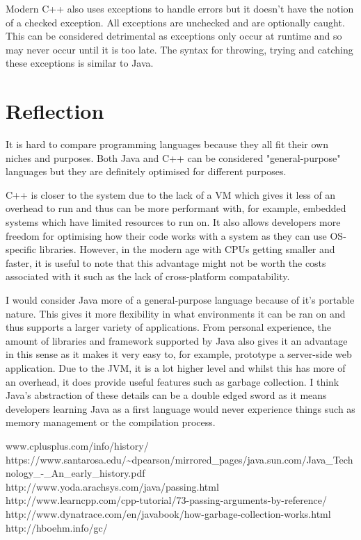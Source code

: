 \documentclass[]{report}
\begin{document}
Modern C++ also uses exceptions to handle errors but it doesn't have the notion of a checked exception. All exceptions are unchecked and are optionally caught. This can be considered detrimental as exceptions only occur at runtime and so may never occur until it is too late. The syntax for throwing, trying and catching these exceptions is similar to Java.

\section{Reflection}

It is hard to compare programming languages because they all fit their own niches and purposes. Both Java and C++ can be considered "general-purpose" languages but they are definitely optimised for different purposes. 

C++ is closer to the system due to the lack of a VM which gives it less of an overhead to run and thus can be more performant with, for example, embedded systems which have limited resources to run on. It also allows developers more freedom for optimising how their code works with a system as they can use OS-specific libraries. However, in the modern age with CPUs getting smaller and faster, it is useful to note that this advantage might not be worth the costs associated with it such as the lack of cross-platform compatability.

I would consider Java more of a general-purpose language because of it's portable nature. This gives it more flexibility in what environments it can be ran on and thus supports a larger variety of applications. From personal experience, the amount of libraries and framework supported by Java also gives it an advantage in this sense as it makes it very easy to, for example, prototype a server-side web application. Due to the JVM, it is a lot higher level and whilst this has more of an overhead, it does provide useful features such as garbage collection. I think Java's abstraction of these details can be a double edged sword as it means developers learning Java as a first language would never experience things such as memory management or the compilation process.

\begin{thebibliography}{20}
	www.cplusplus.com/info/history/
	https://www.santarosa.edu/\textasciitilde{}dpearson/mirrored\_pages/java.sun.com/Java\_Technology\_-\_An\_early\_history.pdf
	http://www.yoda.arachsys.com/java/passing.html
	http://www.learncpp.com/cpp-tutorial/73-passing-arguments-by-reference/
	http://www.dynatrace.com/en/javabook/how-garbage-collection-works.html
		http://hboehm.info/gc/
\end{thebibliography}
\end{document}
